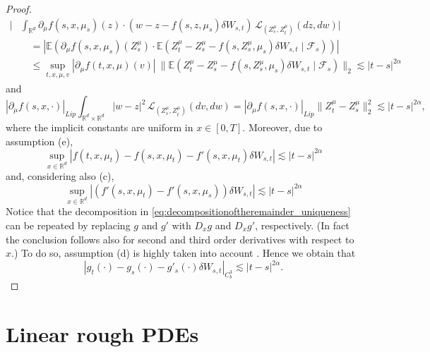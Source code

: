 \documentclass[10pt, a4paper]{article} %
\newcommand{\R}{\mathbb{R}}
\newcommand{\E}{\mathbb{E}}
\theoremstyle{definition}
\theoremstyle{plain}
\begin{document}
\begin{proof}
{\begin{align*}
        \Big| & \int_{\R^d}  \partial_\mu f(s, x,\mu_s) (z) \cdot (w-z-f(s, z,\mu_s) \delta W_{s,t}) \, \mathcal{L}_{(Z^\mu_s,Z^\mu_t)}(dz,dw) \Big| \\ 
        &\quad = \left| \E( \partial_\mu f(s, x,\mu_s) (Z^\mu_s) \cdot \E(Z^\mu_t-Z^\mu_s-f(s, Z^\mu_s,\mu_s) \delta W_{s,t} \mid \mathcal{F}_s) ) \right| \\
        &\quad \le \sup_{t,x,\mu,v} |\partial_\mu f(t, x,\mu)(v)| \  \|\E( Z^\mu_t-Z^\mu_s-f(s, Z^\mu_s,\mu_s) \delta W_{s,t} \mid \mathcal{F}_s)\|_2 \lesssim |t-s|^{2\alpha}
    \end{align*}
    and \begin{equation*}
        |\partial_\mu f(s, x,\cdot)|_{Lip} \int_{\R^d \times \R^d} |w-z|^2 \, \mathcal{L}_{(Z^\mu_s,Z^\mu_t)}(dv,dw) = |\partial_\mu f(s, x,\cdot)|_{Lip} \|Z^\mu_t - Z^\mu_s\|_2^2 \lesssim |t-s|^{2\alpha},
    \end{equation*}
    where the implicit constants are uniform in $x \in [0,T]$.
    }
    Moreover, due to assumption (e), \begin{equation*}
        \sup_{x \in \R^d} |f(t, x,\mu_t) - f(s, x,\mu_t)  - f'(s, x,\mu_t) \delta W_{s,t}| \lesssim |t-s|^{2\alpha}
    \end{equation*} and, considering also (c), \begin{equation*}
        \sup_{x \in \R^d} |(f'(s, x,\mu_t)   - f'(s, x,\mu_s)) \delta W_{s,t}| \lesssim |t-s|^{2\alpha}
    \end{equation*}
    Notice that the decomposition in \eqref{eq:decompositionoftheremainder_uniqueness} can be repeated by replacing $g$ and $g'$ with $D_x g$ and $D_x g'$, respectively. (In fact the conclusion follows also for second and third order derivatives with respect to $x$.) To do so, assumption (d) is highly taken into account . 
    Hence we obtain that \begin{equation*}
        |g_t(\cdot) - g_s(\cdot) - g'_s(\cdot) \delta W_{s,t}|_{C^3_b} \lesssim|t-s|^{2\alpha} .
    \end{equation*}
\end{proof}

\section{Linear rough PDEs} \label{section:linearroughPDEs}
\end{document}
